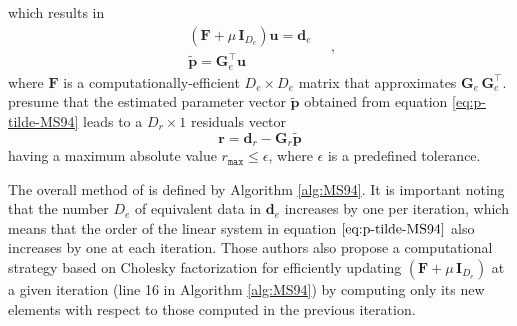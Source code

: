 which results in
\begin{equation}
	\begin{split}
		\left(\mathbf{F} + \mu \, \mathbf{I}_{D_{e}} \right) \mathbf{u} = \mathbf{d}_{e} \\
		\tilde{\mathbf{p}} = \mathbf{G}_{e}^{\top} \mathbf{u}
	\end{split} \quad ,
	\label{eq:p-tilde-MS94}
\end{equation}
where $\mathbf{F}$ is a computationally-efficient $D_{e} \times D_{e}$ matrix that approximates $\mathbf{G}_{e} \, \mathbf{G}_{e}^{\top}$.
\cite{mendonca-silva1994} presume that the estimated parameter vector $\tilde{\mathbf{p}}$ obtained from equation \ref{eq:p-tilde-MS94}
leads to a $D_{r} \times 1$ residuals vector
\begin{equation}
	\mathbf{r} = \mathbf{d}_{r} - \mathbf{G}_{r} \tilde{\mathbf{p}} 
	\label{eq:residuals-MS94}
\end{equation}
having a maximum absolute value $r_{\mathtt{max}} \le \epsilon$, where $\epsilon$ is a predefined tolerance.

The overall method of \cite{mendonca-silva1994} is defined by Algorithm \ref{alg:MS94}.
It is important noting that the number $D_{e}$ of equivalent data in $\mathbf{d}_{e}$ increases by one per iteration,
which means that the order of the linear system in equation $\ref{eq:p-tilde-MS94}$ also increases by one at each iteration.
Those authors also propose a computational strategy based on Cholesky factorization \cite[e.g.,][p. 163]{golub-vanloan2013}
for efficiently updating 
$\left(\mathbf{F} + \mu \, \mathbf{I}_{D_{e}} \right)$ at a given iteration (line 16 in Algorithm \ref{alg:MS94}) 
by computing only its new elements with respect to those computed in the previous iteration.

